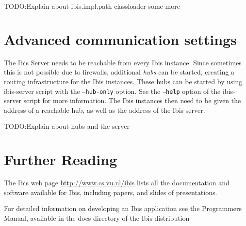 \documentclass[10pt]{article}
\begin{document}
TODO:Explain about ibis.impl.path classloader some more

\section{Advanced communication settings}


The Ibis Server needs to be reachable from every Ibis
instance. Since sometimes this is not possible due to firewalls,
additional \emph{hubs} can be started, creating a routing infrastructure
for the Ibis instances. These hubs can be started by using ibis-server
script with the \texttt{--hub-only} option. See the \texttt{--help}
option of the ibis-server script for more information. The Ibis
instances then need to be given the address of a reachable hub, as well
as the address of the Ibis server.


TODO:Explain about hubs and the server


\section{Further Reading}

The Ibis web page \url{http://www.cs.vu.nl/ibis} lists all
the documentation and software available for Ibis, including papers, and
slides of presentations.

For detailed information on developing an Ibis application see the
Programmers Manual, available in the docs directory of the Ibis
distribution
\end{document}
